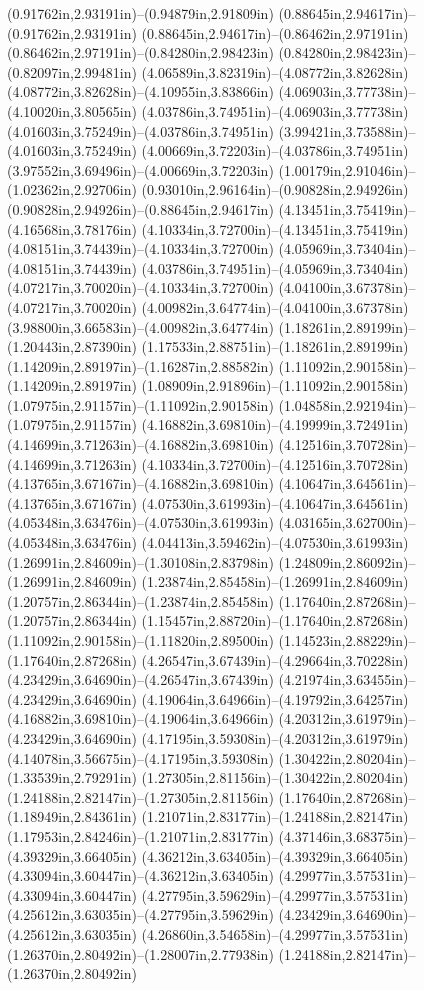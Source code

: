 (0.91762in,2.93191in)--(0.94879in,2.91809in) (0.88645in,2.94617in)--(0.91762in,2.93191in) (0.88645in,2.94617in)--(0.86462in,2.97191in) (0.86462in,2.97191in)--(0.84280in,2.98423in) (0.84280in,2.98423in)--(0.82097in,2.99481in) (4.06589in,3.82319in)--(4.08772in,3.82628in) (4.08772in,3.82628in)--(4.10955in,3.83866in) (4.06903in,3.77738in)--(4.10020in,3.80565in) (4.03786in,3.74951in)--(4.06903in,3.77738in) (4.01603in,3.75249in)--(4.03786in,3.74951in) (3.99421in,3.73588in)--(4.01603in,3.75249in) (4.00669in,3.72203in)--(4.03786in,3.74951in) (3.97552in,3.69496in)--(4.00669in,3.72203in) (1.00179in,2.91046in)--(1.02362in,2.92706in) (0.93010in,2.96164in)--(0.90828in,2.94926in) (0.90828in,2.94926in)--(0.88645in,2.94617in) (4.13451in,3.75419in)--(4.16568in,3.78176in) (4.10334in,3.72700in)--(4.13451in,3.75419in) (4.08151in,3.74439in)--(4.10334in,3.72700in) (4.05969in,3.73404in)--(4.08151in,3.74439in) (4.03786in,3.74951in)--(4.05969in,3.73404in) (4.07217in,3.70020in)--(4.10334in,3.72700in) (4.04100in,3.67378in)--(4.07217in,3.70020in) (4.00982in,3.64774in)--(4.04100in,3.67378in) (3.98800in,3.66583in)--(4.00982in,3.64774in) (1.18261in,2.89199in)--(1.20443in,2.87390in) (1.17533in,2.88751in)--(1.18261in,2.89199in) (1.14209in,2.89197in)--(1.16287in,2.88582in) (1.11092in,2.90158in)--(1.14209in,2.89197in) (1.08909in,2.91896in)--(1.11092in,2.90158in) (1.07975in,2.91157in)--(1.11092in,2.90158in) (1.04858in,2.92194in)--(1.07975in,2.91157in) (4.16882in,3.69810in)--(4.19999in,3.72491in) (4.14699in,3.71263in)--(4.16882in,3.69810in) (4.12516in,3.70728in)--(4.14699in,3.71263in) (4.10334in,3.72700in)--(4.12516in,3.70728in) (4.13765in,3.67167in)--(4.16882in,3.69810in) (4.10647in,3.64561in)--(4.13765in,3.67167in) (4.07530in,3.61993in)--(4.10647in,3.64561in) (4.05348in,3.63476in)--(4.07530in,3.61993in) (4.03165in,3.62700in)--(4.05348in,3.63476in) (4.04413in,3.59462in)--(4.07530in,3.61993in) (1.26991in,2.84609in)--(1.30108in,2.83798in) (1.24809in,2.86092in)--(1.26991in,2.84609in) (1.23874in,2.85458in)--(1.26991in,2.84609in) (1.20757in,2.86344in)--(1.23874in,2.85458in) (1.17640in,2.87268in)--(1.20757in,2.86344in) (1.15457in,2.88720in)--(1.17640in,2.87268in) (1.11092in,2.90158in)--(1.11820in,2.89500in) (1.14523in,2.88229in)--(1.17640in,2.87268in) (4.26547in,3.67439in)--(4.29664in,3.70228in) (4.23429in,3.64690in)--(4.26547in,3.67439in) (4.21974in,3.63455in)--(4.23429in,3.64690in) (4.19064in,3.64966in)--(4.19792in,3.64257in) (4.16882in,3.69810in)--(4.19064in,3.64966in) (4.20312in,3.61979in)--(4.23429in,3.64690in) (4.17195in,3.59308in)--(4.20312in,3.61979in) (4.14078in,3.56675in)--(4.17195in,3.59308in) (1.30422in,2.80204in)--(1.33539in,2.79291in) (1.27305in,2.81156in)--(1.30422in,2.80204in) (1.24188in,2.82147in)--(1.27305in,2.81156in) (1.17640in,2.87268in)--(1.18949in,2.84361in) (1.21071in,2.83177in)--(1.24188in,2.82147in) (1.17953in,2.84246in)--(1.21071in,2.83177in) (4.37146in,3.68375in)--(4.39329in,3.66405in) (4.36212in,3.63405in)--(4.39329in,3.66405in) (4.33094in,3.60447in)--(4.36212in,3.63405in) (4.29977in,3.57531in)--(4.33094in,3.60447in) (4.27795in,3.59629in)--(4.29977in,3.57531in) (4.25612in,3.63035in)--(4.27795in,3.59629in) (4.23429in,3.64690in)--(4.25612in,3.63035in) (4.26860in,3.54658in)--(4.29977in,3.57531in) (1.26370in,2.80492in)--(1.28007in,2.77938in) (1.24188in,2.82147in)--(1.26370in,2.80492in) 